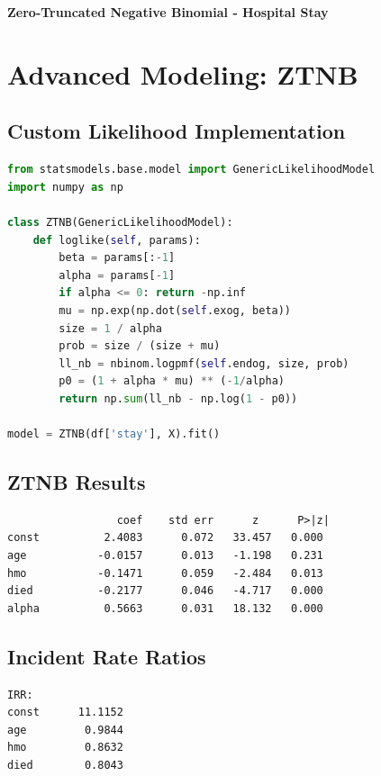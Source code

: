 \documentclass[12pt, a4paper]{article}
\newcounter{problemcounter}
\newcommand{\problemtitle}[1]{%
    \vspace{1cm}
    \begin{tcolorbox}[
        colback=DeepForest!5,
        colframe=DeepForest,
        arc=15pt,
        boxrule=1.2pt,
        left=20pt,
        right=20pt,
        top=12pt,
        bottom=12pt,
        enhanced,
        attach boxed title to top center={yshift=-8pt},
        boxed title style={
            colback=AmberSunset,
            colframe=DeepForest,
            arc=10pt,
            outer arc=10pt,
            boxrule=0.8pt,
            sharp corners,
            },
        title={\color{white}\large\sffamily\bfseries \faTasks \quad PROBLEM \arabic{problemcounter}}
    ]
        \centering
        {\color{DeepForest}\Large\bfseries\sffamily #1}
    \end{tcolorbox}
    \stepcounter{problemcounter}
    \vspace{0.3cm}
}
\begin{document}
\newpage

\problemtitle{Zero-Truncated Negative Binomial - Hospital Stay}

\section*{Advanced Modeling: ZTNB}

\subsection*{Custom Likelihood Implementation}

\begin{lstlisting}[language=Python]
from statsmodels.base.model import GenericLikelihoodModel
import numpy as np

class ZTNB(GenericLikelihoodModel):
    def loglike(self, params):
        beta = params[:-1]
        alpha = params[-1]
        if alpha <= 0: return -np.inf
        mu = np.exp(np.dot(self.exog, beta))
        size = 1 / alpha
        prob = size / (size + mu)
        ll_nb = nbinom.logpmf(self.endog, size, prob)
        p0 = (1 + alpha * mu) ** (-1/alpha)
        return np.sum(ll_nb - np.log(1 - p0))

model = ZTNB(df['stay'], X).fit()
\end{lstlisting}

\subsection*{ZTNB Results}

\begin{outputbox}
\begin{verbatim}
                 coef    std err      z      P>|z|
const          2.4083      0.072   33.457   0.000
age           -0.0157      0.013   -1.198   0.231
hmo           -0.1471      0.059   -2.484   0.013
died          -0.2177      0.046   -4.717   0.000
alpha          0.5663      0.031   18.132   0.000
\end{verbatim}
\end{outputbox}

\subsection*{Incident Rate Ratios}

\begin{outputbox}
\begin{verbatim}
IRR:
const      11.1152
age         0.9844
hmo         0.8632
died        0.8043
\end{verbatim}
\end{outputbox}
\end{document}
